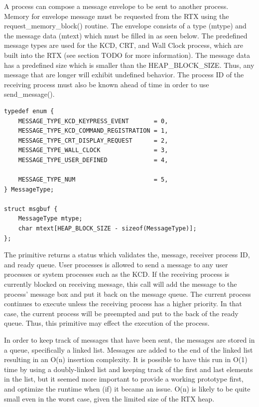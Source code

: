 \documentclass[12pt,twocolumn]{report}
\begin{document}
\par A process can compose a message envelope to be sent to another process. Memory for envelope message must be requested from the RTX using the request\_memory\_block() routine. The envelope consists of a type (mtype) and the message data (mtext) which must be filled in as seen below. The predefined message types are used for the KCD, CRT, and Wall Clock process, which are built into the RTX (see section TODO for more information). The message data has a predefined size which is smaller than the HEAP\_BLOCK\_SIZE. Thus, any message that are longer will exhibit undefined behavior. The process ID of the receiving process must also be known ahead of time in order to use send\_message().
\newline
\begin{lstlisting}
typedef enum {
    MESSAGE_TYPE_KCD_KEYPRESS_EVENT       = 0,
    MESSAGE_TYPE_KCD_COMMAND_REGISTRATION = 1,
    MESSAGE_TYPE_CRT_DISPLAY_REQUEST      = 2,
    MESSAGE_TYPE_WALL_CLOCK               = 3,
    MESSAGE_TYPE_USER_DEFINED             = 4,

    MESSAGE_TYPE_NUM                      = 5,
} MessageType;

struct msgbuf {
    MessageType mtype;
    char mtext[HEAP_BLOCK_SIZE - sizeof(MessageType)];
};
\end{lstlisting}
\par The primitive returns a status which validates the, message, receiver process ID, and ready queue. User processes is allowed to send a message to any user processes or system processes such as the KCD. If the receiving process is currently blocked on receiving message, this call will add the message to the process' message box and put it back on the message queue. The current process continues to execute unless the receiving process has a higher priority. In that case, the current process will be preempted and put to the back of the ready queue. Thus, this primitive may effect the execution of the process.

\par In order to keep track of messages that have been sent, the messages are stored in a queue, specifically a linked list. Messages are added to the end of the linked list resulting in an O(n) insertion complexity. It is possible to have this run in O(1) time by using a doubly-linked list and keeping track of the first and last elements in the list, but it seemed more important to provide a working prototype first, and optimize the runtime when (if) it became an issue. O(n) is likely to be quite small even in the worst case, given the limited size of the RTX heap.
\newline
\end{document}
